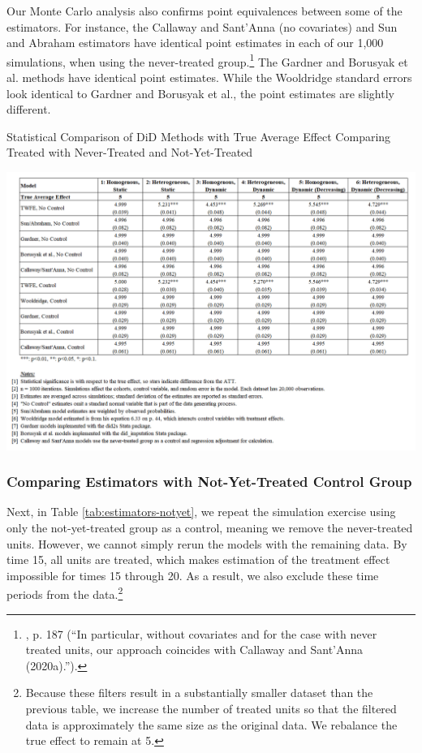 \documentclass[12pt]{article}
\begin{document}
Our Monte Carlo analysis also confirms point equivalences between some of the estimators. For instance, the Callaway and Sant’Anna (no covariates) and Sun and Abraham estimators have identical point estimates in each of our 1,000 simulations, when using the never-treated group.\footnote{\citet{sunabr2021a}, p. 187 (“In particular, without covariates and for the case with never treated units, our approach coincides with Callaway and Sant’Anna (2020a).”).}  The Gardner and Borusyak et al. methods have identical point estimates. While the Wooldridge standard errors look identical to Gardner and Borusyak et al., the point estimates are slightly different.
\begin{table}[H]
    \centering
    \caption{Statistical Comparison of DiD Methods with True Average Effect
Comparing Treated with Never-Treated and Not-Yet-Treated}
    \includegraphics[width=6in]{Figures/Table 1.png}
    \label{tab:estimators-never}
\end{table}

\subsubsection{Comparing Estimators with Not-Yet-Treated Control Group}
Next, in Table \ref{tab:estimators-notyet}, we repeat the simulation exercise using only the not-yet-treated group as a control, meaning we remove the never-treated units. However, we cannot simply rerun the models with the remaining data. By time 15, all units are treated, which makes estimation of the treatment effect impossible for times 15 through 20. As a result, we also exclude these time periods from the data.\footnote{Because these filters result in a substantially smaller dataset than the previous table, we increase the number of treated units so that the filtered data is approximately the same size as the original data. We rebalance the true effect to remain at 5.} 
\end{document}
